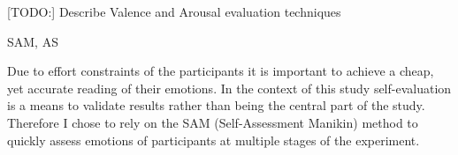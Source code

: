 


[TODO:] Describe Valence and Arousal evaluation techniques

SAM, AS

Due to effort constraints of the participants it is important to achieve a cheap, yet accurate reading of their emotions. In the context of this study self-evaluation is a means to validate results rather than being the central part of the study. Therefore I chose to rely on the SAM (Self-Assessment Manikin) method \cite{Bradley1994} to quickly assess emotions of participants at multiple stages of the experiment.